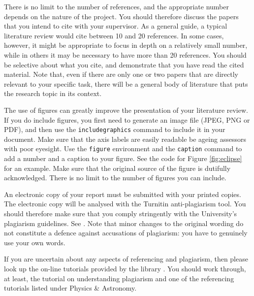 \documentclass[a4paper,11pt]{article}
\begin{document}
There is no limit to the number of references, and the appropriate number depends on the nature of the project.  You should therefore discuss the papers that you intend to cite with your supervisor.  As a general guide, a typical literature review would cite between 10 and 20 references. In some cases, however, it might be appropriate to focus in depth on a relatively small number, while in others it may be necessary to have more than 20 references. You should be selective about what you cite, and demonstrate that you have read the cited material. 
 Note that, even if there are only one or two papers that are directly relevant to your specific task, there will be a general body of literature that puts the research topic in its context.
 
The use of figures can greatly improve the presentation of your literature review. If you do include figures, you first need to generate an image file (JPEG, PNG or PDF), and then use the {\tt includegraphics} command to include it in your document. Make sure that the axis labels are easily readable be ageing assessors with poor eyesight. Use the {\tt figure} environment and the {\tt caption} command to add a number and a caption to your figure. See the code for Figure \ref{fig:eclipse} for an example. Make sure that the original source of the figure is dutifully acknowledged. There is no limit to the number of figures you can include.

An electronic copy of your report must be submitted with your printed copies. The electronic copy will be analysed with the Turnitin anti-plagiarism tool. You should therefore make sure that you comply stringently with the University's plagiarism guidelines. See \cite{plagiarism}. Note that minor changes to the original wording do not constitute a defence against accusations of plagiarism: you have to genuinely use your own words.

If you are uncertain about any aspects of referencing and plagiarism, then please look up the on-line tutorials provided by the library \cite{Referencing}. You should work through, at least, the tutorial on understanding plagiarism and one of the referencing tutorials listed under Physics \& Astronomy. 
\end{document}
